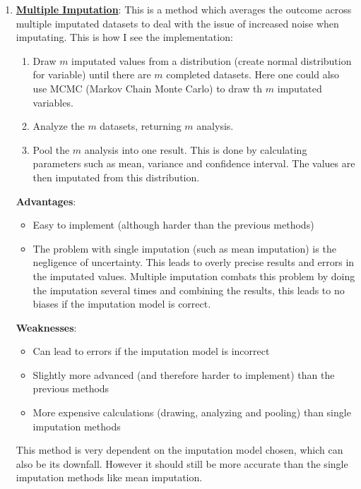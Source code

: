 \documentclass[11pt, english]{../Template/NTNUoving}
\begin{document}
\begin{oppgave}
\begin{enumerate}
        \item \textbf{\href{https://en.wikipedia.org/wiki/Imputation_(statistics)\#Multiple_imputation}{Multiple Imputation}}: This is a method which averages the outcome across multiple imputated datasets to deal with the issue of increased noise when imputating.
        This is how I see the implementation:
        \begin{enumerate}
            \item Draw $m$ imputated values from a distribution (create normal distribution for variable) until there are $m$ completed datasets. Here one could also use MCMC (Markov Chain Monte Carlo) to draw th $m$ imputated variables.
            \item Analyze the $m$ datasets, returning $m$ analysis.
            \item Pool the $m$ analysis into one result. This is done by calculating parameters such as mean, variance and confidence interval. The values are then imputated from this distribution.
        \end{enumerate}
        \textbf{Advantages}:
        \begin{itemize}
            \item Easy to implement (although harder than the previous methods)
            \item The problem with single imputation (such as mean imputation) is the negligence of uncertainty. This leads to overly precise results and errors in the imputated values.
            Multiple imputation combats this problem by doing the imputation several times and combining the results, this leads to no biases if the imputation model is correct.
        \end{itemize}
        \textbf{Weaknesses}:
        \begin{itemize}
            \item Can lead to errors if the imputation model is incorrect
            \item Slightly more advanced (and therefore harder to implement) than the previous methods
            \item More expensive calculations (drawing, analyzing and pooling) than single imputation methods
        \end{itemize}
        This method is very dependent on the imputation model chosen, which can also be its downfall. However it should still be more accurate than the
        single imputation methods like mean imputation.
    \end{enumerate}
\end{oppgave}
\end{document}
